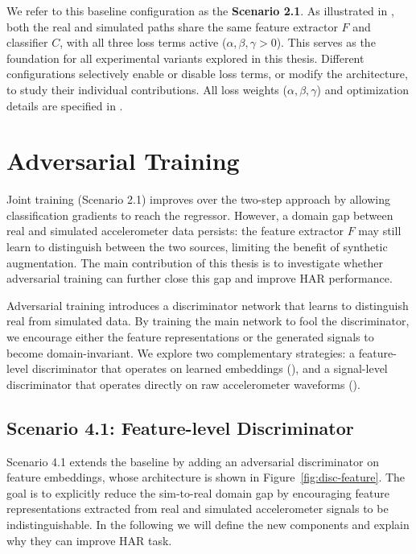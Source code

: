 We refer to this baseline configuration as the \textbf{Scenario 2.1}. As illustrated in , both the real and simulated paths share the same feature extractor $F$ and classifier $C$, with all three loss terms active ($\alpha, \beta, \gamma > 0$). This serves as the foundation for all experimental variants explored in this thesis. Different configurations selectively enable or disable loss terms, or modify the architecture, to study their individual contributions. All loss weights ($\alpha, \beta, \gamma$) and optimization details are specified in .

\section{Adversarial Training}
\label{sec:adversarial}

Joint training (Scenario 2.1) improves over the two-step approach by allowing classification gradients to reach the regressor. However, a domain gap between real and simulated accelerometer data persists: the feature extractor $F$ may still learn to distinguish between the two sources, limiting the benefit of synthetic augmentation. The main contribution of this thesis is to investigate whether adversarial training can further close this gap and improve HAR performance.

Adversarial training introduces a discriminator network that learns to distinguish real from simulated data. By training the main network to fool the discriminator, we encourage either the feature representations or the generated signals to become domain-invariant. We explore two complementary strategies: a feature-level discriminator that operates on learned embeddings (), and a signal-level discriminator that operates directly on raw accelerometer waveforms ().

\subsection{Scenario 4.1: Feature-level Discriminator}
\label{sec:scenario-disc-feature}

Scenario 4.1 extends the baseline by adding an adversarial discriminator on feature embeddings, whose architecture is shown in Figure~\ref{fig:disc-feature}. The goal is to explicitly reduce the sim-to-real domain gap by encouraging feature representations extracted from real and simulated accelerometer signals to be indistinguishable. In the following we will define the new components and explain why they can improve HAR task.

